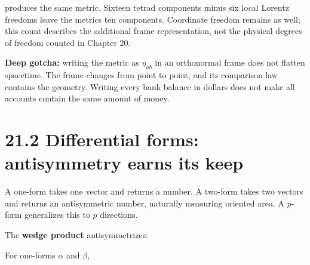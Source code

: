 \documentclass[
  11pt,
  letterpaper,
  oneside,
  openany]{scrbook}
\begin{document}
\begin{center}
\begingroup
{}
\ifdim\wd\grmathbox>\linewidth
\resizebox{\linewidth}{!}{\usebox{\grmathbox}}
\else\usebox{\grmathbox}\fi
\endgroup
\end{center}

produces the same metric. Sixteen tetrad components minus six local
Lorentz freedoms leave the metric\textquotesingle s ten components.
Coordinate freedom remains as well; this count describes the additional
frame representation, not the physical degrees of freedom counted in
Chapter 20.

\textbf{Deep gotcha:} writing the metric as \(\eta_{ab}\) in an
orthonormal frame does not flatten spacetime. The frame changes from
point to point, and its comparison law contains the geometry. Writing
every bank balance in dollars does not make all accounts contain the
same amount of money.

\hypertarget{differential-forms-antisymmetry-earns-its-keep}{%
\section{21.2 Differential forms: antisymmetry earns its
keep}\label{differential-forms-antisymmetry-earns-its-keep}}

A one-form takes one vector and returns a number. A two-form takes two
vectors and returns an antisymmetric number, naturally measuring
oriented area. A \(p\)-form generalizes this to \(p\) directions.

The \textbf{wedge product} antisymmetrizes:

\begin{center}
\begingroup
{}
\ifdim\wd\grmathbox>\linewidth
\resizebox{\linewidth}{!}{\usebox{\grmathbox}}
\else\usebox{\grmathbox}\fi
\endgroup
\end{center}

For one-forms \(\alpha\) and \(\beta\),

\begin{center}
\begingroup
{}
\ifdim\wd\grmathbox>\linewidth
\resizebox{\linewidth}{!}{\usebox{\grmathbox}}
\else\usebox{\grmathbox}\fi
\endgroup
\end{center}
\end{document}
